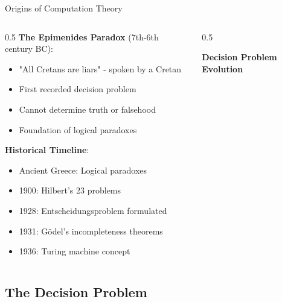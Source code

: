 \documentclass[aspectratio=169]{beamer}
\newcommand{\concept}[1]{\textbf{\color{darkblue}#1}}
\begin{document}
\begin{frame}{Origins of Computation Theory}
\begin{columns}
\begin{column}{0.5\textwidth}
\concept{The Epimenides Paradox} (7th-6th century BC):
\begin{itemize}
\item "All Cretans are liars" - spoken by a Cretan
\item First recorded decision problem
\item Cannot determine truth or falsehood
\item Foundation of logical paradoxes
\end{itemize}

\vspace{0.3cm}
\concept{Historical Timeline}:
\begin{itemize}
\item Ancient Greece: Logical paradoxes
\item 1900: Hilbert's 23 problems
\item 1928: Entscheidungsproblem formulated
\item 1931: Gödel's incompleteness theorems
\item 1936: Turing machine concept
\end{itemize}
\end{column}
\begin{column}{0.5\textwidth}
\begin{center}
\textbf{Decision Problem Evolution}
\vspace{0.3cm}

\end{center}
\end{column}
\end{columns}
\end{frame}

\subsection{The Decision Problem}
\end{document}
